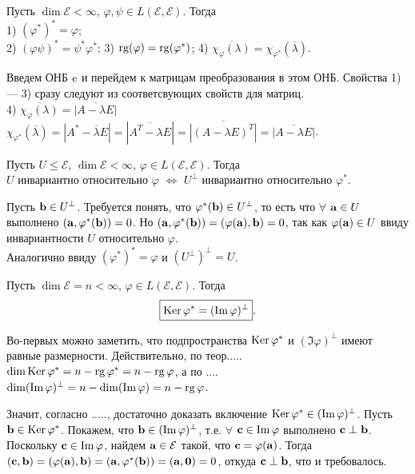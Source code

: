 \begin{sled2}
Пусть $\dim \mathcal{E}<\infty $, $\varphi, \psi \in L(\mathcal{E}, \mathcal{E})$. Тогда \\
1) $(\varphi ^{*})^{*} = \varphi$;\\
2) $(\varphi \psi)^{*} = \psi^{*} \varphi^{*}$;
3) $\mathop{\rm rg}\nolimits (\varphi) = \mathop{\rm rg}\nolimits (\varphi ^{*})$;
4) $\overline{\chi_{\varphi} (\lambda)} = \chi_{\varphi ^{*}} (\overline{\lambda})$.
\end{sled2}
\dok Введем ОНБ $\mathrm{e}$ и перейдем к матрицам преобразования в этом ОНБ. Свойства 1) --- 3) сразу следуют из соответсвующих свойств для матриц.\\
4) $\overline{\chi_{\varphi} (\lambda)} =\overline{|A-\lambda E|}$
$\chi_{\varphi ^{*}} (\overline{\lambda}) = |A^*-\overline{\lambda} E| = |\overline{A^T-\lambda E}| = 
\overline{|(A-\lambda E)^T|} = \overline{|A-\lambda E|}$.
\edok

\begin{theor}\label{t10_3_1} 
Пусть $U\leq \mathcal{E}$, $\dim \mathcal{E} <\infty$, $\varphi \in L(\mathcal{E}, \mathcal{E})$. Тогда  \\
$U$ инвариантно относительно $\varphi$ 
$\Leftrightarrow$ 
$U^{\bot}$ инвариантно относительно $\varphi ^{*}$.
\end{theor}
\dok 
\dokright
Пусть $\mathbf{b} \in U^{\bot}$. Требуется понять, что $\varphi ^{*} (\mathbf{b}) \in U^{\bot}$, то есть что 
$\forall$ $\mathbf{a} \in U$ выполнено $(\mathbf{a}, \varphi ^{*} (\mathbf{b})) = 0$.
Но $(\mathbf{a}, \varphi ^{*} (\mathbf{b})) = (\varphi (\mathbf{a}), \mathbf{b}) = 0$, так как $\varphi (\mathbf{a}) \in U$ ввиду инвариантности $U$ относительно $\varphi$.\\
\dokleft Аналогично ввиду $(\varphi ^{*})^{*} = \varphi$ и $(U^{\bot})^{\bot} = U$.
\edok

\begin{theor}\label{t10_3_2} 
Пусть $\dim \mathcal{E}=n <\infty$, $\varphi \in L(\mathcal{E}, \mathcal{E})$. Тогда  \\
$$\boxed{\mathop{\rm Ker}\nolimits \varphi ^{*} = (\mathop{\rm Im}\nolimits \varphi)^{\bot }}.$$
\end{theor}
\dok  Во-первых можно заметить, что подпространства $\mathop{\rm Ker}\nolimits \varphi ^{*}$ и $(\Im \varphi)^{\bot }$ имеют равные размерности.
Действительно, по теор..... $\mathop{\rm dim}\nolimits \mathop{\rm Ker}\nolimits \varphi ^{*} = n-\mathop{\rm rg}\nolimits \varphi ^{*} = n-\mathop{\rm rg}\nolimits \varphi$, а по ....
$\mathop{\rm dim}\nolimits (\mathop{\rm Im}\nolimits \varphi)^{\bot } = n - \mathop{\rm dim}\nolimits (\mathop{\rm Im}\nolimits \varphi) =  n-\mathop{\rm rg}\nolimits \varphi$.

Значит, согласно ....., достаточно доказать включение $\mathop{\rm Ker}\nolimits \varphi ^{*} \in  (\mathop{\rm Im}\nolimits \varphi)^{\bot }$.
Пусть $\mathbf{b}\in \mathop{\rm Ker}\nolimits \varphi ^{*}$. Покажем, что $\mathbf{b}\in (\mathop{\rm Im}\nolimits \varphi)^{\bot }$, т.е. $\forall$ $\mathbf{c}\in \mathop{\rm Im}\nolimits \varphi$
выполнено $\mathbf{c}\perp \mathbf{b}$. Поскольку $\mathbf{c}\in \mathop{\rm Im}\nolimits \varphi$, найдем $\mathbf{a}\in \mathcal{E}$ такой, что $\mathbf{c} = \varphi (\mathbf{a})$.
Тогда  $(\mathbf{c}, \mathbf{b}) = (\varphi (\mathbf{a}), \mathbf{b}) = (\mathbf{a}, \varphi ^{*}(\mathbf{b})) = (\mathbf{a}, \mathbf{0}) = 0$, откуда $\mathbf{c}\perp \mathbf{b}$, что и требовалось.
\edok

